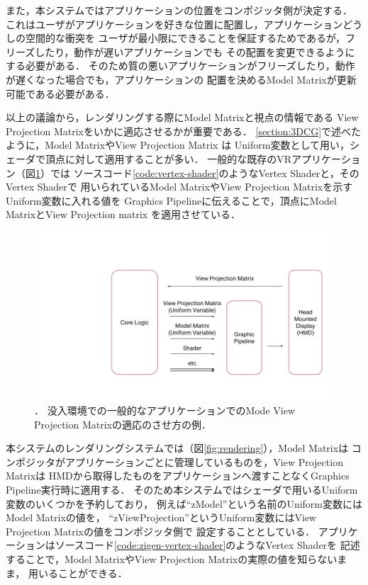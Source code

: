 また，本システムではアプリケーションの位置をコンポジッタ側が決定する．
これはユーザがアプリケーションを好きな位置に配置し，アプリケーションどうしの空間的な衝突を
ユーザが最小限にできることを保証するためであるが，フリーズしたり，動作が遅いアプリケーションでも
その配置を変更できるようにする必要がある．
そのため質の悪いアプリケーションがフリーズしたり，動作が遅くなった場合でも，アプリケーションの
配置を決めるModel Matrixが更新可能である必要がある．

以上の議論から，レンダリングする際にModel Matrixと視点の情報である
View Projection Matrixをいかに適応させるかが重要である．
\ref{section:3DCG}で述べたように，Model MatrixやView Projection Matrix は
Uniform変数として用い，シェーダで頂点に対して適用することが多い．
一般的な既存のVRアプリケーション（図\ref{fig:app-mvp}）では
ソースコード\ref{code:vertex-shader}のようなVertex Shaderと，そのVertex Shaderで
用いられているModel MatrixやView Projection Matrixを示すUniform変数に入れる値を
Graphics Pipelineに伝えることで，頂点にModel MatrixとView Projection matrix
を適用させている．

\begin{figure}[htbp]
  \centering
  \includegraphics[keepaspectratio, width=1\linewidth]{figures/app-mvp.png}
  \caption{．
    没入環境での一般的なアプリケーションでのMode View Projection Matrixの適応のさせ方の例．
  }
  \label{fig:app-mvp}
\end{figure}

本システムのレンダリングシステムでは（図\ref{fig:rendering}），Model Matrixは
コンポジッタがアプリケーションごとに管理しているものを，View Projection Matrixは
HMDから取得したものをアプリケーションへ渡すことなくGraphics Pipeline実行時に適用する．
そのため本システムではシェーダで用いるUniform変数のいくつかを予約しており，
例えば``zModel''という名前のUniform変数にはModel Matrixの値を，
``zViewProjection''というUniform変数にはView Projection Matrixの値をコンポジッタ側で
設定することとしている．
アプリケーションはソースコード\ref{code:zigen-vertex-shader}のようなVertex Shaderを
記述することで，Model MatrixやView Projection Matrixの実際の値を知らないまま，
用いることができる．

